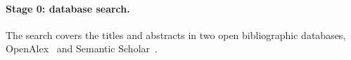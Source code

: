 \paragraph{Stage 0: database search.} The search covers the titles and abstracts
in two open bibliographic databases, OpenAlex~\parencite{priem2022openalex} and
Semantic Scholar~\parencite{kinney2023semantic}.
%
%
